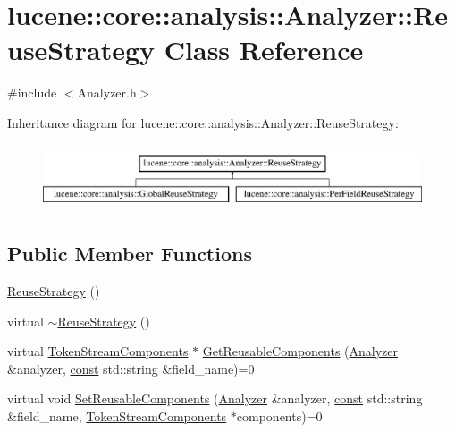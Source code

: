 \hypertarget{classlucene_1_1core_1_1analysis_1_1Analyzer_1_1ReuseStrategy}{}\section{lucene\+:\+:core\+:\+:analysis\+:\+:Analyzer\+:\+:Reuse\+Strategy Class Reference}
\label{classlucene_1_1core_1_1analysis_1_1Analyzer_1_1ReuseStrategy}


{\ttfamily \#include $<$Analyzer.\+h$>$}

Inheritance diagram for lucene\+:\+:core\+:\+:analysis\+:\+:Analyzer\+:\+:Reuse\+Strategy\+:\begin{figure}[H]
\begin{center}
\leavevmode
\includegraphics[height=1.951219cm]{classlucene_1_1core_1_1analysis_1_1Analyzer_1_1ReuseStrategy}
\end{center}
\end{figure}
\subsection*{Public Member Functions}
\begin{DoxyCompactItemize}
\item 
\mbox{\hyperlink{classlucene_1_1core_1_1analysis_1_1Analyzer_1_1ReuseStrategy_ac552252b82448b1e6012ff4024d99bfb}{Reuse\+Strategy}} ()
\item 
virtual \mbox{\hyperlink{classlucene_1_1core_1_1analysis_1_1Analyzer_1_1ReuseStrategy_ad113005e836ba6846d1fa2b6a1ae5924}{$\sim$\+Reuse\+Strategy}} ()
\item 
virtual \mbox{\hyperlink{classlucene_1_1core_1_1analysis_1_1TokenStreamComponents}{Token\+Stream\+Components}} $\ast$ \mbox{\hyperlink{classlucene_1_1core_1_1analysis_1_1Analyzer_1_1ReuseStrategy_ab180767950f392037e8ddf78c2f11f95}{Get\+Reusable\+Components}} (\mbox{\hyperlink{classlucene_1_1core_1_1analysis_1_1Analyzer}{Analyzer}} \&analyzer, \mbox{\hyperlink{ZlibCrc32_8h_a2c212835823e3c54a8ab6d95c652660e}{const}} std\+::string \&field\+\_\+name)=0
\item 
virtual void \mbox{\hyperlink{classlucene_1_1core_1_1analysis_1_1Analyzer_1_1ReuseStrategy_a78a1328d5564e78e2168169b73094b23}{Set\+Reusable\+Components}} (\mbox{\hyperlink{classlucene_1_1core_1_1analysis_1_1Analyzer}{Analyzer}} \&analyzer, \mbox{\hyperlink{ZlibCrc32_8h_a2c212835823e3c54a8ab6d95c652660e}{const}} std\+::string \&field\+\_\+name, \mbox{\hyperlink{classlucene_1_1core_1_1analysis_1_1TokenStreamComponents}{Token\+Stream\+Components}} $\ast$components)=0
\end{DoxyCompactItemize}


